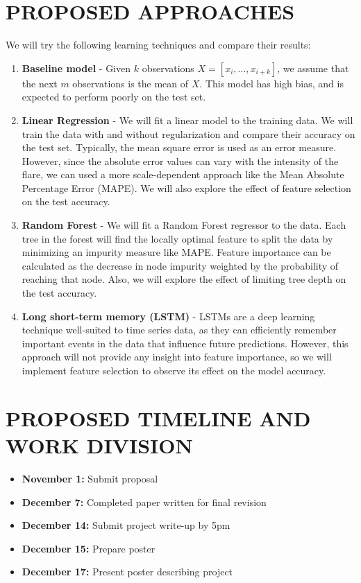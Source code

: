 \documentclass[letterpaper, 10 pt, onecolumn]{ieeeconf}
\begin{document}
\section{PROPOSED APPROACHES}
We will try the following learning techniques and compare their results:
\begin{enumerate}
    \item \textbf{Baseline model} - Given $k$ observations $X = [x_i, \hdots , x_{i+k}]$, we assume that the next $m$ observations is the mean of $X$. This model has high bias, and is expected to perform poorly on the test set.
    \item \textbf{Linear Regression} - We will fit a linear model to the training data. We will train the data with and without regularization and compare their accuracy on the test set. Typically, the mean square error is used as an error measure. However, since the absolute error values can vary with the intensity of the flare, we can used a more scale-dependent approach like the Mean Absolute Percentage Error (MAPE). We will also explore the effect of feature selection on the test accuracy.
    \item \textbf{Random Forest} - We will fit a Random Forest regressor to the data. Each tree in the forest will find the locally optimal feature to split the data by minimizing an impurity measure like MAPE. Feature importance can be calculated as the decrease in node impurity weighted by the probability of reaching that node. Also, we will explore the effect of limiting tree depth on the test accuracy.
    \item \textbf{Long short-term memory (LSTM)} - LSTMs are a deep learning technique well-suited to time series data, as they can efficiently remember important events in the data that influence future predictions. However, this approach will not provide any insight into feature importance, so we will implement feature selection to observe its effect on the model accuracy.
\end{enumerate}

\section{PROPOSED TIMELINE AND WORK DIVISION}
\begin{itemize}
    \item \textbf{November 1:} Submit proposal
    \item \textbf{December 7:} Completed paper written for final revision
    \item \textbf{December 14:} Submit project write-up by 5pm 
    \item \textbf{December 15:} Prepare poster 
    \item \textbf{December 17:} Present poster describing project
\end{itemize}
\end{document}
